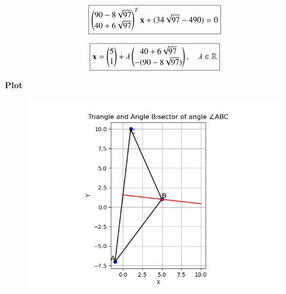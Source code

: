 \documentclass[12pt]{article}
\begin{document}
\begin{align*}
\boxed{ \begin{pmatrix}90-8\sqrt{97} \\ 40+6\sqrt{97}\end{pmatrix}^T \mathbf{x} + (34\sqrt{97}-490) = 0 }
\end{align*}

\begin{align*}
\boxed{\mathbf{x} = \begin{pmatrix}5 \\ 1\end{pmatrix} + \lambda\begin{pmatrix}40+6\sqrt{97} \\ -(90-8\sqrt{97})\end{pmatrix},\quad \lambda \in \mathbb{R}}
\end{align*}

\textbf{Plot}
\begin{figure}[H]
    \centering
    \includegraphics[width=0.8\columnwidth]{Figs/Figure_1.png}
\end{figure}
\end{document}
